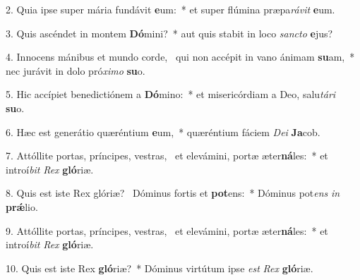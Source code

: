 2. Quia ipse super mária fundávit \textbf{e}um:~*  et super flúmina præpa\textit{rá}\textit{vit} \textbf{e}um.\

3. Quis ascéndet in montem \textbf{Dó}mini?~*  aut quis stabit in loco \textit{sanc}\textit{to} \textbf{e}jus?\

4. Innocens mánibus et mundo corde, \dag\  qui non accépit in vano ánimam \textbf{su}am,~*  nec jurávit in dolo pró\textit{xi}\textit{mo} \textbf{su}o.\

5. Hic accípiet benedictiónem a \textbf{Dó}mino:~*  et misericórdiam a Deo, salu\textit{tá}\textit{ri} \textbf{su}o.\

6. Hæc est generátio quæréntium \textbf{e}um,~*  quæréntium fáciem \textit{De}\textit{i} \textbf{Ja}cob.\

7. Attóllite portas, príncipes, vestras, \dag\  et elevámini, portæ æter\textbf{ná}les:~*  et introí\textit{bit} \textit{Rex} \textbf{gló}riæ.\

8. Quis est iste Rex glóriæ? \dag\  Dóminus fortis et \textbf{pot}ens:~*  Dóminus pot\textit{ens} \textit{in} \textbf{prǽ}lio.\

9. Attóllite portas, príncipes, vestras, \dag\  et elevámini, portæ æter\textbf{ná}les:~*  et introí\textit{bit} \textit{Rex} \textbf{gló}riæ.\

10. Quis est iste Rex \textbf{gló}riæ?~*  Dóminus virtútum ipse \textit{est} \textit{Rex} \textbf{gló}riæ.\

